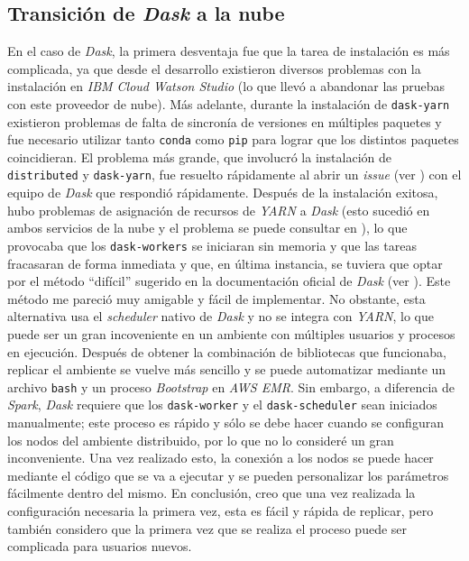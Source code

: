 \subsection{Transición de \textit{Dask} a la nube}

En el caso de \textit{Dask}, la primera desventaja fue que la tarea de instalación es más complicada, ya que desde el desarrollo existieron diversos problemas con la instalación en \textit{IBM Cloud Watson Studio} (lo que llevó a abandonar las pruebas con este proveedor de nube). Más adelante, durante la instalación de \texttt{dask-yarn} existieron problemas de falta de sincronía de versiones en múltiples paquetes y fue necesario utilizar tanto \texttt{conda} como \texttt{pip} para lograr que los distintos paquetes coincidieran. El problema más grande, que involucró la instalación de \texttt{distributed} y \texttt{dask-yarn}, fue resuelto rápidamente al abrir un \textit{issue} (ver \cite{issue-dask-yarn}) con el equipo de \textit{Dask} que respondió rápidamente. Después de la instalación exitosa, hubo problemas de asignación de recursos de \textit{YARN} a \textit{Dask} (esto sucedió en ambos servicios de la nube y el problema se puede consultar en \cite{q-dask-yarn}), lo que provocaba que los \texttt{dask-workers} se iniciaran sin memoria y que las tareas fracasaran de forma inmediata y que, en última instancia, se tuviera que optar por el método ``difícil'' sugerido en la documentación oficial de \textit{Dask} (ver \cite{daskdistributedsetup}). Este método me pareció muy amigable y fácil de implementar. No obstante, esta alternativa usa el \textit{scheduler} nativo de \textit{Dask} y no se integra con \textit{YARN}, lo que puede ser un gran incoveniente en un ambiente con múltiples usuarios y procesos en ejecución. Después de obtener la combinación de bibliotecas que funcionaba, replicar el ambiente se vuelve más sencillo y se puede automatizar mediante un archivo \texttt{bash} y un proceso \textit{Bootstrap} en \textit{AWS EMR}. Sin embargo, a diferencia de \textit{Spark}, \textit{Dask} requiere que los \texttt{dask-worker} y el \texttt{dask-scheduler} sean iniciados manualmente; este proceso es rápido y sólo se debe hacer cuando se configuran los nodos del ambiente distribuido, por lo que no lo consideré un gran inconveniente. Una vez realizado esto, la conexión a los nodos se puede hacer mediante el código que se va a ejecutar y se pueden personalizar los parámetros fácilmente dentro del mismo. En conclusión, creo que una vez realizada la configuración necesaria la primera vez, esta es fácil y rápida de replicar, pero también considero que la primera vez que se realiza el proceso puede ser complicada para usuarios nuevos. 

